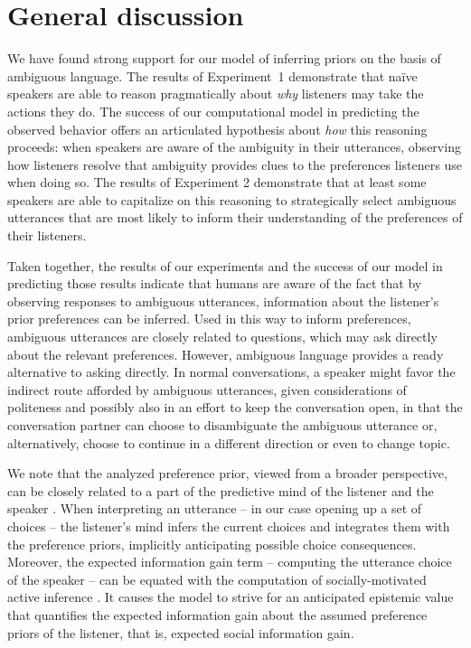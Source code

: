 \documentclass[10pt,a4paper]{article}
\newcommand{\gcs}[1]{\textcolor{blue}{[gcs: #1]}}
\begin{document}
\section{General discussion}

We have found strong support for our model of inferring priors on the basis of ambiguous language.
The results of Experiment~1 demonstrate that na\"ive speakers are able to reason pragmatically about \emph{why} listeners may take the actions they do. 
The success of our computational model in predicting the observed behavior offers an articulated hypothesis about \emph{how} this reasoning proceeds: when speakers are aware of the ambiguity in their utterances, observing how listeners resolve that ambiguity provides clues to the preferences listeners use when doing so.
The results of Experiment 2 demonstrate that at least some speakers are able to capitalize on this reasoning to strategically select ambiguous utterances that are most likely to inform their understanding of the preferences of their listeners.

Taken together, the results of our experiments and the success of our model in predicting those results indicate that humans are aware of the fact that by observing responses to ambiguous utterances, information about the listener's prior preferences can be inferred. 
Used in this way to inform preferences, ambiguous utterances are closely related to questions, which may ask directly about the relevant preferences. 
However, ambiguous language provides a ready alternative to asking directly. In normal conversations, a speaker might favor the indirect route afforded by ambiguous utterances, given considerations of politeness and possibly also in an effort to keep the conversation open, in that the conversation partner can choose to disambiguate the ambiguous utterance or, alternatively, choose to continue in a different direction or even to change topic.


We note that the analyzed preference prior, viewed from a broader perspective, can be closely related to a part of the predictive mind of the listener and the speaker \cite{Butz:2016,Butz:2017}. 
When interpreting an utterance -- in our case opening up a set of choices -- the listener's mind infers the current choices and integrates them with the preference priors, implicitly anticipating possible choice consequences.
Moreover, the expected information gain term -- computing the utterance choice of the speaker -- can be equated with the computation of socially-motivated active inference \cite{Butz:2017a,Friston:2015}.
It causes the model to strive for an anticipated epistemic value that quantifies the expected information gain about the assumed preference priors of the listener, that is, expected social information gain. 
\end{document}
